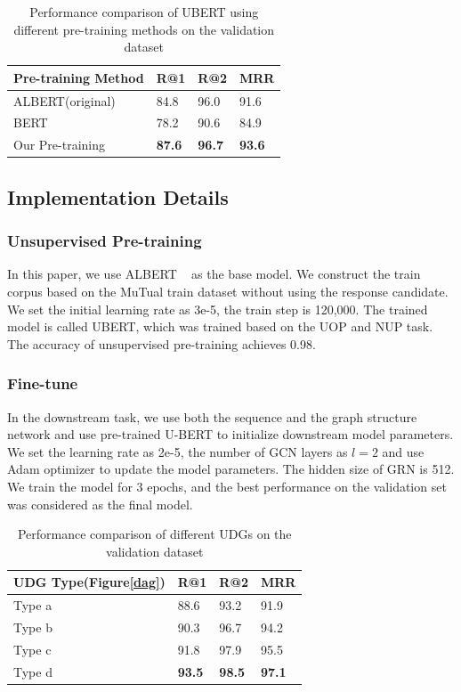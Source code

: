 \documentclass[letterpaper]{article} %
\begin{document}
\begin{table}[t]
\centering
\begin{tabular}{l|l|l|l}
\hline
   Pre-training Method & R@1 & R@2 & MRR \\  \hline
   ALBERT(original) & 84.8 & 96.0 & 91.6  \\
   BERT ~\cite{devlin2018bert} & 78.2 & 90.6 & 84.9  \\
   Our Pre-training  & \textbf{87.6} & \textbf{96.7} & \textbf{93.6}  \\  \hline

\end{tabular}
\caption{Performance comparison of UBERT using different pre-training methods on the validation dataset}
\label{pre-training_result}
\end{table}

\subsection{Implementation Details}
\subsubsection{Unsupervised Pre-training} In this paper, we use ALBERT ~\cite{Lan2020} as the base model. We construct the train corpus based on the MuTual train dataset without using the response candidate. We set
the initial learning rate as 3e-5, the train step is 120,000. The trained model is called UBERT, which was trained based on the UOP and NUP task. The accuracy of unsupervised pre-training achieves 0.98.
\subsubsection{Fine-tune}
In the downstream task, we use both the sequence and the graph structure network and use pre-trained U-BERT to initialize downstream model parameters. We set the learning rate as 2e-5, the number of GCN layers as $l=2$ and use Adam optimizer to update the model parameters. The hidden size of GRN is 512. We train the model for 3 epochs, and the best performance on the validation set was considered as the final model.

\begin{table}[t]
\centering
\begin{tabular}{l|l|l|l}
\hline
   UDG Type(Figure\ref{dag}) & R@1 & R@2 & MRR \\  \hline
   Type a  & 88.6 & 93.2 & 91.9  \\
   Type b  & 90.3 & 96.7 & 94.2  \\
   Type c  & 91.8 & 97.9 & 95.5  \\
   Type d & \textbf{93.5} & \textbf{98.5} & \textbf{97.1}  \\ \hline

\end{tabular}
\caption{Performance comparison of different UDGs on the validation dataset}
\label{dag_result}
\end{table}
\end{document}
